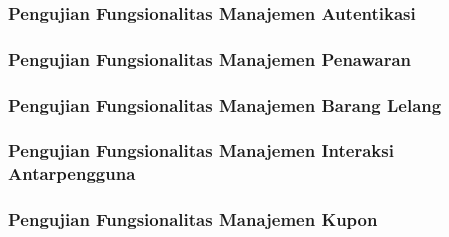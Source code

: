 		
	\subsubsection{Pengujian Fungsionalitas Manajemen Autentikasi}	
	
%	
		
	\subsubsection{Pengujian Fungsionalitas Manajemen Penawaran}
	
		
	\subsubsection{Pengujian Fungsionalitas Manajemen Barang Lelang}
	
			
	\subsubsection{Pengujian Fungsionalitas Manajemen Interaksi Antarpengguna}
	
	
%	
	
	\subsubsection{Pengujian Fungsionalitas Manajemen Kupon}
	
	
			

	